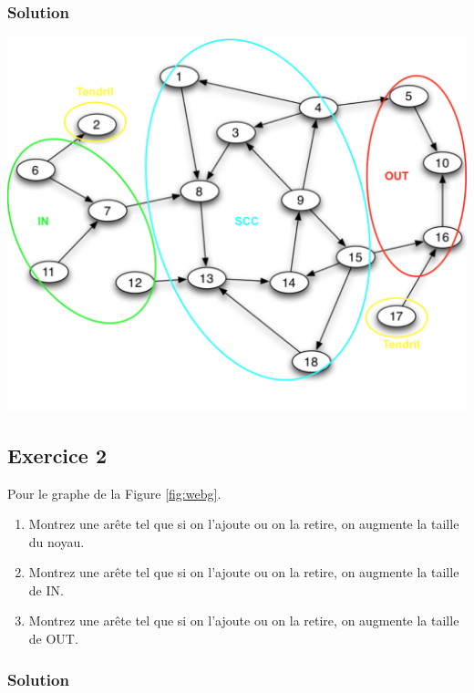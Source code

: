     \subsubsection*{Solution}

    \begin{center}
    \includegraphics[scale=0.5]{pic/TP11Q1.png}
    \end{center}


\subsection*{Exercice 2}
Pour le graphe de la Figure \ref{fig:webg}.
\begin{enumerate}
 \item Montrez une arête tel que si on l'ajoute ou on la retire, on augmente la taille du noyau.
 \item Montrez une arête tel que si on l'ajoute ou on la retire, on augmente la taille de IN.
 \item Montrez une arête tel que si on l'ajoute ou on la retire, on augmente la taille de OUT.
\end{enumerate}

    \subsubsection*{Solution}

